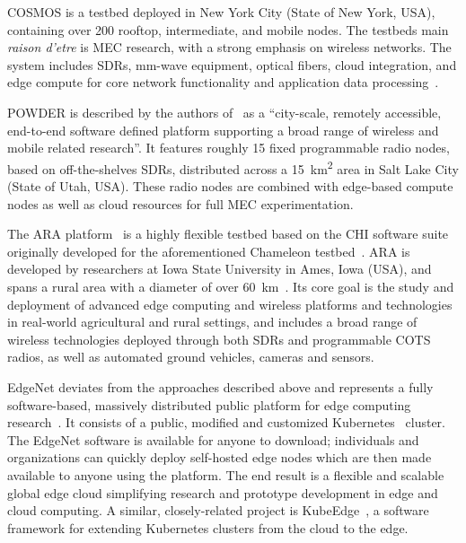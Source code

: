 \gls{COSMOS} is a testbed deployed in New York City (State of New York, \gls{USA}), containing over \num{200} rooftop, intermediate, and mobile nodes.
The testbeds main \emph{raison d'etre} is \gls{MEC} research, with a strong emphasis on wireless networks.
The system includes \glspl{SDR}, \si{\milli\meter}-wave equipment, optical fibers, cloud integration, and edge compute for core network functionality and application data processing~\cite{yu2019cosmos,raychaudhuri2020challenge}.

\gls{POWDER} is described by the authors of~\cite{breen2020powder} as a ``city-scale, remotely accessible, end-to-end software defined platform supporting a broad range of wireless and mobile related research''.
It features roughly \num{15} fixed programmable radio nodes, based on off-the-shelves \glspl{SDR}, distributed across a \SI{15}{\kilo\meter\squared} area in Salt Lake City (State of Utah, \gls{USA}).
These radio nodes are combined with edge-based compute nodes as well as cloud resources for full \gls{MEC} experimentation.

The \gls{ARA} platform~\cite{zhang2022ara} is a highly flexible testbed based on the \gls{CHI} software suite originally developed for the aforementioned Chameleon testbed~\cite{keahey2020lessons}.
\gls{ARA} is developed by researchers at Iowa State University in Ames, Iowa (\gls{USA}), and spans a rural area with a diameter of over \SI{60}{\kilo\meter}~\cite{zhang2022ara}.
Its core goal is the study and deployment of advanced edge computing and wireless platforms and technologies in real-world agricultural and rural settings, and includes a broad range of wireless technologies deployed through both \glspl{SDR} and programmable \gls{COTS} radios, as well as automated ground vehicles, cameras and sensors.

EdgeNet deviates from the approaches described above and represents a fully software-based, massively distributed public platform for edge computing research~\cite{cappos2018edgenet,senel2021edgenet1,senel2021edgenet2}.
It consists of a public, modified and customized Kubernetes~\cite{kubernetes} cluster.
The EdgeNet software is available for anyone to download;
individuals and organizations can quickly deploy self-hosted edge nodes which are then made available to anyone using the platform.
The end result is a flexible and scalable global edge cloud simplifying research and prototype development in edge and cloud computing.
A similar, closely-related project is KubeEdge~\cite{xiong2018extend}, a software framework for extending Kubernetes clusters from the cloud to the edge.


